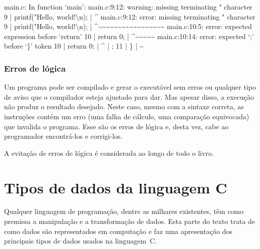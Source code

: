 \documentclass[
  11pt,
  a4paper,
]{scrbook}
\newenvironment{Shaded}{\begin{snugshade}}{\end{snugshade}}
\newcommand{\NormalTok}[1]{#1}
\begin{document}
\begin{Shaded}
\begin{Highlighting}[]
\NormalTok{main.c: In function ‘main’:}
\NormalTok{main.c:9:12: warning: missing terminating " character}
\NormalTok{    9 |     printf("Hello, world!\textbackslash{}n);}
\NormalTok{      |            \^{}}
\NormalTok{main.c:9:12: error: missing terminating " character}
\NormalTok{    9 |     printf("Hello, world!\textbackslash{}n);}
\NormalTok{      |            \^{}\textasciitilde{}\textasciitilde{}\textasciitilde{}\textasciitilde{}\textasciitilde{}\textasciitilde{}\textasciitilde{}\textasciitilde{}\textasciitilde{}\textasciitilde{}\textasciitilde{}\textasciitilde{}\textasciitilde{}\textasciitilde{}\textasciitilde{}\textasciitilde{}\textasciitilde{}}
\NormalTok{main.c:10:5: error: expected expression before ‘return’}
\NormalTok{   10 |     return 0;}
\NormalTok{      |     \^{}\textasciitilde{}\textasciitilde{}\textasciitilde{}\textasciitilde{}\textasciitilde{}}
\NormalTok{main.c:10:14: error: expected ‘;’ before ‘\}’ token}
\NormalTok{   10 |     return 0;}
\NormalTok{      |              \^{}}
\NormalTok{      |              ;}
\NormalTok{   11 | \}}
\NormalTok{      | \textasciitilde{}             }
\end{Highlighting}
\end{Shaded}

\subsection{Erros de lógica}\label{erros-de-luxf3gica}

Um programa pode ser compilado e gerar o executável sem erros ou
qualquer tipo de aviso que o compilador esteja ajustado para dar. Mas
apesar disso, a execução não produz o resultado desejado. Neste caso,
mesmo com a sintaxe correta, as instruções contém um erro (uma falha de
cálculo, uma comparação equivocada) que invalida o programa. Esse são os
erros de lógica e, desta vez, cabe ao programador encontrá-los e
corrigi-los.

A evitação de erros de lógica é considerada ao longo de todo o livro.

\chapter{Tipos de dados da linguagem C}\label{sec-tipos-de-dados}

Qualquer linguagem de programação, dentre as milhares existentes, têm
como premissa a manipulação e a transformação de dados. Esta parte do
texto trata de como dados são representados em computação e faz uma
apresentação dos principais tipos de dados usados na linguagem~C.
\end{document}
